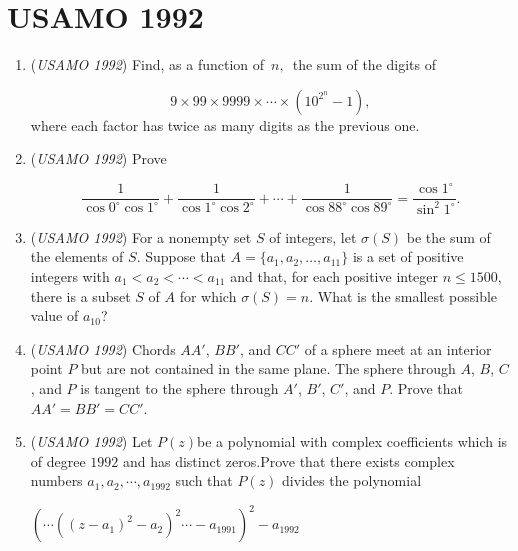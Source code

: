 \section{USAMO 1992}
        \begin{enumerate}
        	\item (\textit{USAMO 1992}) Find, as a function of $\, n, \,$ the sum of the digits of 

 \[9 \times 99 \times 9999 \times \cdots \times \left( 10^{2^n} - 1 \right),\] 
where each factor has twice as many digits as the previous one.


 

	\item (\textit{USAMO 1992}) Prove 

 \[\frac{1}{\cos 0^\circ \cos 1^\circ} +  \frac{1}{\cos 1^\circ \cos 2^\circ} + \cdots + \frac{1}{\cos 88^\circ \cos 89^\circ} = \frac{\cos 1^\circ}{\sin^2 1^\circ}.\]


	\item (\textit{USAMO 1992}) For a nonempty set $S$ of integers, let $\sigma(S)$ be the sum of the elements of $S$. Suppose that $A = \{a_1, a_2, \ldots, a_{11}\}$ is a set of positive integers with $a_1 < a_2 < \cdots < a_{11}$ and that, for each positive integer $n \le 1500$, there is a subset $S$ of $A$ for which $\sigma(S) = n$. What is the smallest possible value of $a_{10}$?


 

	\item (\textit{USAMO 1992}) Chords $AA'$, $BB'$, and $CC'$ of a sphere meet at an interior point $P$ but are not contained in the same plane.  The sphere through $A$, $B$, $C$, and $P$ is tangent to the sphere through $A'$, $B'$, $C'$, and $P$.  Prove that $AA'=BB'=CC'$.


 

	\item (\textit{USAMO 1992}) Let $P(z)$be a polynomial with complex coefficients which is of degree $1992$ and has distinct zeros.Prove that there exists complex numbers $a_1,a_2,\cdots,a_{1992}$ such that $P(z)$ divides the polynomial


 $\left(\cdots\left(\left(z-a_1\right)^2-a_2\right)^2\cdots-a_{1991}\right)^2-a_{1992}$


\end{enumerate}